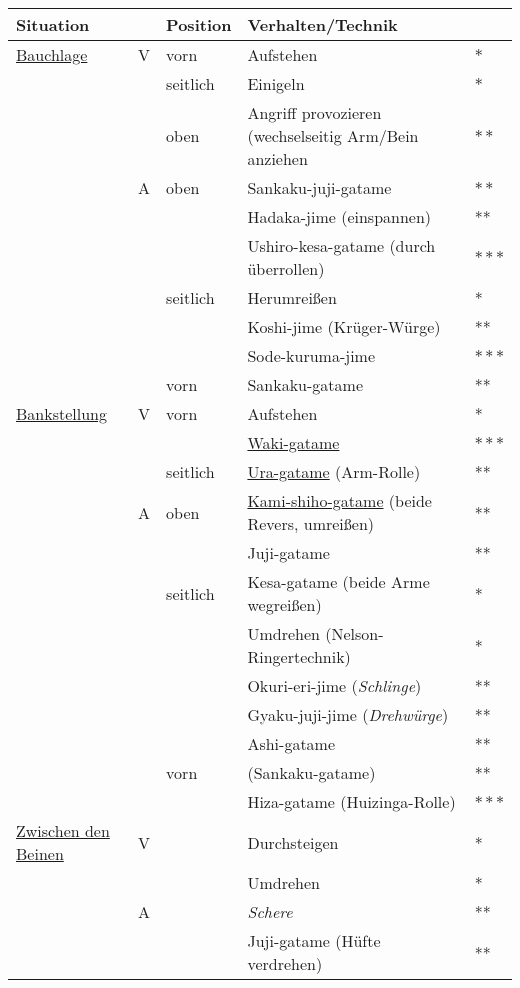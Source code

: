 \documentclass[justified, a4paper, notitlepage, captions=tableheading, nobib]{tufte-handout}
\begin{document}
\begin{center}
\begin{tabular}{lllll}
Situation\footnotemark &  & Position & Verhalten/Technik & \\
\hline
\hyperref[orgffa54d6]{Bauchlage} & V & vorn & Aufstehen & \(\ast\)\\
 &  & seitlich & Einigeln & \(\ast\)\\
 &  & oben & Angriff provozieren (wechselseitig Arm/Bein anziehen & \(\ast \ast\)\\
 & A & oben & Sankaku-juji-gatame & \(\ast \ast\)\\
 &  &  & Hadaka-jime (einspannen) & **\\
 &  &  & Ushiro-kesa-gatame (durch überrollen) & \(\ast \ast \ast\)\\
 &  & seitlich & Herumreißen & *\\
 &  &  & Koshi-jime (Krüger-Würge) & **\\
 &  &  & Sode-kuruma-jime & \(\ast \ast \ast\)\\
 &  & vorn & Sankaku-gatame & **\\
\hline
\hyperref[orgf95c5ab]{Bankstellung} & V & vorn & Aufstehen & *\\
 &  &  & \hyperref[orgdf10e51]{Waki-gatame} & \(\ast \ast \ast\)\\
 &  & seitlich & \hyperref[org129be2a]{Ura-gatame} (Arm-Rolle) & **\\
 & A & oben & \hyperref[orgc5066bb]{Kami-shiho-gatame} (beide Revers, umreißen) & **\\
 &  &  & Juji-gatame & **\\
 &  & seitlich & Kesa-gatame (beide Arme wegreißen) & *\\
 &  &  & Umdrehen (Nelson-Ringertechnik) & *\\
 &  &  & Okuri-eri-jime (\emph{Schlinge}) & **\\
 &  &  & Gyaku-juji-jime (\emph{Drehwürge}) & **\\
 &  &  & Ashi-gatame & **\\
 &  & vorn & (Sankaku-gatame) & **\\
 &  &  & Hiza-gatame (Huizinga-Rolle)\footnotemark & \(\ast \ast \ast\)\\
\hline
\hyperref[orga527e99]{Zwischen den Beinen} & V &  & Durchsteigen & *\\
 &  &  & Umdrehen & *\\
 & A &  & \emph{Schere} & **\\
 &  &  & Juji-gatame (Hüfte verdrehen) & **\\

\end{tabular}
\end{center}
\end{document}

